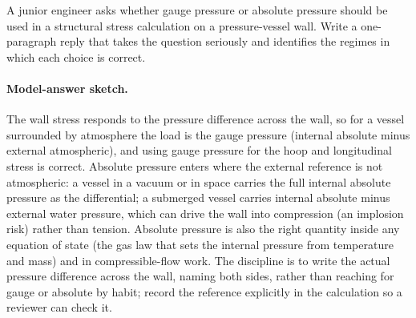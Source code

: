 \begin{exercise}
A junior engineer asks whether gauge pressure or absolute
pressure should be used in a structural stress calculation on a
pressure-vessel wall. Write a one-paragraph reply that takes the
question seriously and identifies the regimes in which each
choice is correct.

\paragraph{Model-answer sketch.} The wall stress responds to the
pressure difference across the wall, so for a vessel surrounded by
atmosphere the load is the gauge pressure (internal absolute minus
external atmospheric), and using gauge pressure for the hoop and
longitudinal stress is correct. Absolute pressure enters where the
external reference is not atmospheric: a vessel in a vacuum or in space
carries the full internal absolute pressure as the differential; a
submerged vessel carries internal absolute minus external water
pressure, which can drive the wall into compression (an implosion risk)
rather than tension. Absolute pressure is also the right quantity inside
any equation of state (the gas law that sets the internal pressure from
temperature and mass) and in compressible-flow work. The discipline is
to write the actual pressure difference across the wall, naming both
sides, rather than reaching for gauge or absolute by habit; record the
reference explicitly in the calculation so a reviewer can check it.
\end{exercise}

